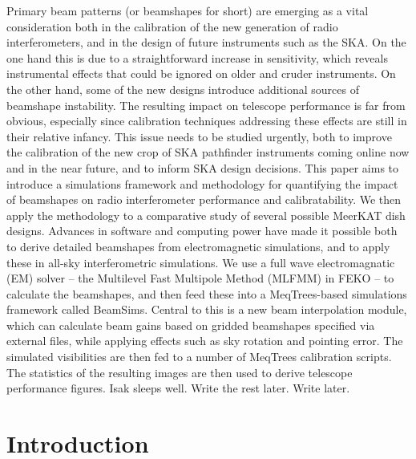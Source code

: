 \documentclass{aa}
\begin{document}
\abstract%
{Primary beam patterns (or beamshapes for short) are emerging as a vital consideration both in the calibration of the new generation of radio interferometers, and in the design of future instruments such as the SKA. On the one hand this is due to a straightforward increase in sensitivity, which reveals instrumental effects that could be ignored on older and cruder instruments. On the other hand, some of the new designs introduce additional sources of beamshape instability. The resulting impact on telescope performance is far from obvious, especially since calibration techniques addressing these effects are still in their relative infancy. This issue needs to be studied urgently, both to improve the calibration of the new crop of SKA pathfinder instruments coming online now and in the near future, and to inform SKA design decisions.}
{This paper aims to introduce a simulations framework and methodology for quantifying the impact of beamshapes on radio interferometer performance and calibratability. We then apply the methodology to a comparative study of several possible MeerKAT dish designs.}
{Advances in software and computing power have made it possible both to derive detailed beamshapes from electromagnetic simulations, and to apply these in all-sky interferometric simulations. We use a full wave electromagnatic (EM) solver -- the Multilevel Fast Multipole Method (MLFMM) in FEKO -- to calculate the beamshapes, and then feed these into a MeqTrees-based simulations framework called BeamSims. Central to this is a new beam interpolation module, which can calculate beam gains based on gridded beamshapes specified via external files, while
applying effects such as sky rotation and pointing error. The simulated visibilities are then fed to a number of MeqTrees calibration scripts. The statistics of the resulting images are then used to derive telescope performance figures.}
{Isak sleeps well. Write the rest later.}
{Write later.}


\maketitle

\section{Introduction}
\end{document}
